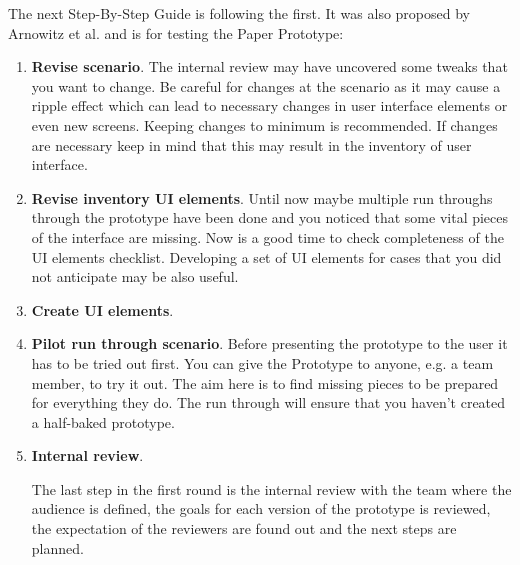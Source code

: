 The next Step-By-Step Guide is following the first. It was also proposed by Arnowitz et al. \cite{arnowitz2010effective} and is for testing the Paper Prototype:

\begin{enumerate}
	\item \textbf{Revise scenario}. The internal review may have uncovered some tweaks that you want to change. Be careful for changes at the scenario as it may cause a ripple effect which can lead to necessary changes in user interface elements or even new screens. Keeping changes to minimum is recommended. If changes are necessary keep in mind that this may result in the inventory of user interface.
	\item \textbf{Revise inventory UI elements}.
	Until now maybe multiple run throughs through the prototype have been done and you noticed that some vital pieces of the interface are missing. Now is a good time to check completeness of the UI elements checklist. Developing a set of UI elements for cases that you did not anticipate may be also useful.
	\item \textbf{Create UI elements}.
	
	
	\item \textbf{Pilot run through scenario}. Before presenting the prototype to the user it has to be tried out first. You can give the Prototype to anyone, e.g. a team member, to try it out. The aim here is to find missing pieces to be prepared for everything they do. The run through will ensure that you haven't created a half-baked prototype.
	
	\item \textbf{Internal review}. 
	
	The last step in the first round is the internal review with the team where the audience is defined, the goals for each version of the prototype is reviewed, the expectation of the reviewers are found out and the next steps are planned.
	

\end{enumerate}
